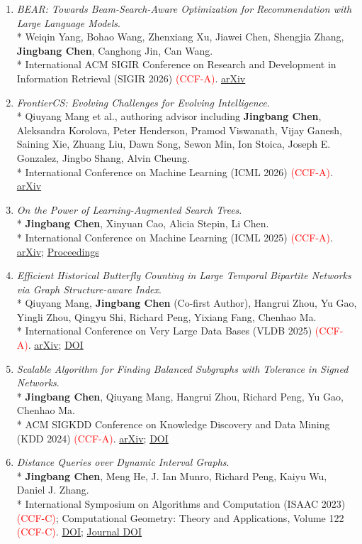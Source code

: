 \documentclass[10pt]{article}
\newcommand{\ccf}[1]{\textcolor{red}{(CCF-#1)}}
\newcommand{\pub}[4]{%
  \item \begin{minipage}[t]{\linewidth}\raggedright
  \textit{#1}.\\*
  #2\\*
  #3 #4
  \end{minipage}
}
\begin{document}
\begin{enumerate}[leftmargin=1.7em,itemsep=4pt,topsep=3pt]
  \pub{BEAR: Towards Beam-Search-Aware Optimization for Recommendation with Large Language Models}
  {Weiqin Yang, Bohao Wang, Zhenxiang Xu, Jiawei Chen, Shengjia Zhang, \textbf{Jingbang Chen}, Canghong Jin, Can Wang.}
  {International ACM SIGIR Conference on Research and Development in Information Retrieval (SIGIR 2026) \ccf{A}.}
  { \href{https://arxiv.org/abs/2601.22925}{arXiv}}

  \pub{FrontierCS: Evolving Challenges for Evolving Intelligence}
  {Qiuyang Mang et al., authoring advisor including \textbf{Jingbang Chen}, Aleksandra Korolova, Peter Henderson, Pramod Viswanath, Vijay Ganesh, Saining Xie, Zhuang Liu, Dawn Song, Sewon Min, Ion Stoica, Joseph E. Gonzalez, Jingbo Shang, Alvin Cheung.}
  {International Conference on Machine Learning (ICML 2026) \ccf{A}.}
  { \href{https://arxiv.org/abs/2512.15699}{arXiv}}

  \pub{On the Power of Learning-Augmented Search Trees}
  {\textbf{Jingbang Chen}, Xinyuan Cao, Alicia Stepin, Li Chen.}
  {International Conference on Machine Learning (ICML 2025) \ccf{A}.}
  { \href{https://arxiv.org/abs/2211.09251}{arXiv}; \href{https://proceedings.mlr.press/v267/chen25e.html}{Proceedings}}

  \pub{Efficient Historical Butterfly Counting in Large Temporal Bipartite Networks via Graph Structure-aware Index}
  {Qiuyang Mang, \textbf{Jingbang Chen} (Co-first Author), Hangrui Zhou, Yu Gao, Yingli Zhou, Qingyu Shi, Richard Peng, Yixiang Fang, Chenhao Ma.}
  {International Conference on Very Large Data Bases (VLDB 2025) \ccf{A}.}
  { \href{https://arxiv.org/abs/2406.00344}{arXiv}; \href{https://doi.org/10.14778/3725688.3725693}{DOI}}

  \pub{Scalable Algorithm for Finding Balanced Subgraphs with Tolerance in Signed Networks}
  {\textbf{Jingbang Chen}, Qiuyang Mang, Hangrui Zhou, Richard Peng, Yu Gao, Chenhao Ma.}
  {ACM SIGKDD Conference on Knowledge Discovery and Data Mining (KDD 2024) \ccf{A}.}
  { \href{https://arxiv.org/abs/2402.05006}{arXiv}; \href{https://doi.org/10.1145/3637528.3671674}{DOI}}

  \pub{Distance Queries over Dynamic Interval Graphs}
  {\textbf{Jingbang Chen}, Meng He, J. Ian Munro, Richard Peng, Kaiyu Wu, Daniel J. Zhang.}
  {International Symposium on Algorithms and Computation (ISAAC 2023) \ccf{C}; Computational Geometry: Theory and Applications, Volume 122 \ccf{C}.}
  { \href{https://doi.org/10.4230/LIPIcs.ISAAC.2023.18}{DOI}; \href{https://doi.org/10.1016/j.comgeo.2024.102103}{Journal DOI}}


\end{enumerate}
\end{document}
